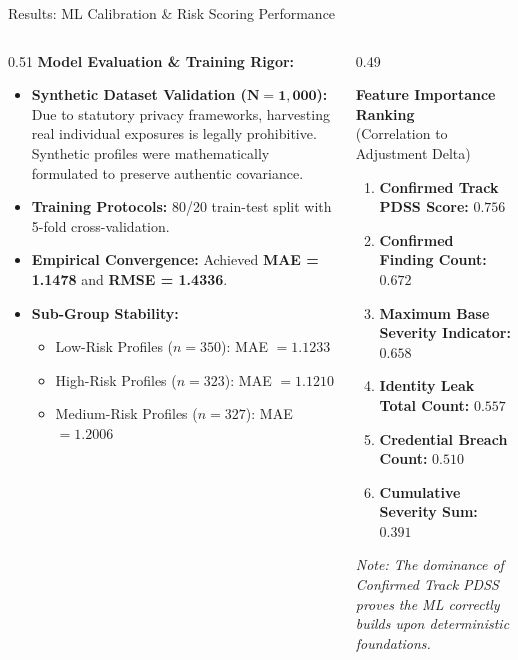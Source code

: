 \documentclass[aspectratio=169,10pt]{beamer}
\begin{document}
\begin{frame}{Results: ML Calibration \& Risk Scoring Performance}
  \footnotesize
  \begin{columns}[T]
    \begin{column}{0.51\textwidth}
      \textbf{Model Evaluation \& Training Rigor:}
      \begin{itemize}\setlength{\itemsep}{0.12cm}
        \item \textbf{Synthetic Dataset Validation ($\mathbf{N=1,000}$):} Due to statutory privacy frameworks, harvesting real individual exposures is legally prohibitive. Synthetic profiles were mathematically formulated to preserve authentic covariance.
        \item \textbf{Training Protocols:} 80/20 train-test split with 5-fold cross-validation.
        \item \textbf{Empirical Convergence:} Achieved \textbf{MAE = 1.1478} and \textbf{RMSE = 1.4336}.
        \item \textbf{Sub-Group Stability:}
          \begin{itemize}\setlength{\itemsep}{0.06cm}
            \item \scriptsize Low-Risk Profiles ($n=350$): MAE $= 1.1233$
            \item \scriptsize High-Risk Profiles ($n=323$): MAE $= 1.1210$
            \item \scriptsize Medium-Risk Profiles ($n=327$): MAE $= 1.2006$
          \end{itemize}
      \end{itemize}
    \end{column}
    \begin{column}{0.49\textwidth}
      \begin{block}{\centering \textbf{Feature Importance Ranking}\\ (Correlation to Adjustment Delta)}
        \scriptsize
        \begin{enumerate}\setlength{\itemsep}{0.12cm}
          \item \textbf{Confirmed Track PDSS Score:} $0.756$
          \item \textbf{Confirmed Finding Count:} $0.672$
          \item \textbf{Maximum Base Severity Indicator:} $0.658$
          \item \textbf{Identity Leak Total Count:} $0.557$
          \item \textbf{Credential Breach Count:} $0.510$
          \item \textbf{Cumulative Severity Sum:} $0.391$
        \end{enumerate}
      \end{block}
      \vspace{0.10cm}
      \scriptsize \textit{Note: The dominance of Confirmed Track PDSS proves the ML correctly builds upon deterministic foundations.}
    \end{column}
  \end{columns}
\end{frame}
\end{document}
